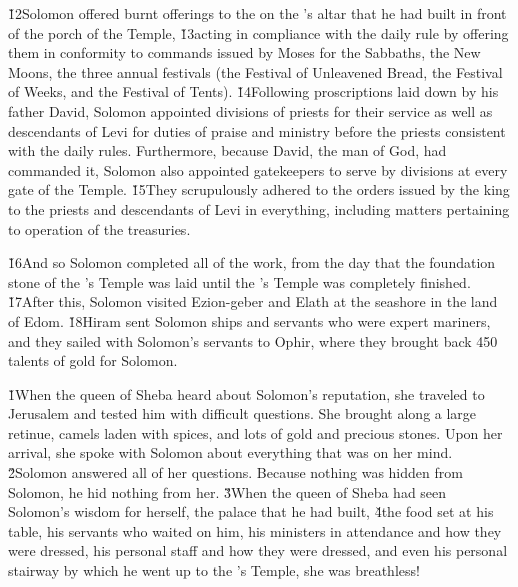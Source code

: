 \v{12}Solomon offered burnt offerings to the  on the 's altar that he had built in front of the porch of the Temple, \v{13}acting in compliance with the daily rule by offering them in conformity to commands issued by Moses for the Sabbaths, the New Moons, the three annual festivals (the Festival of Unleavened Bread, the Festival of Weeks, and the Festival of Tents). \v{14}Following proscriptions laid down by his father David, Solomon appointed divisions of priests for their service as well as descendants of Levi for duties of praise and ministry before the priests consistent with the daily rules. Furthermore, because David, the man of God, had commanded it, Solomon also appointed gatekeepers to serve by divisions at every gate of the Temple. \v{15}They scrupulously adhered to the orders issued by the king to the priests and descendants of Levi in everything, including matters pertaining to operation of the treasuries.

\v{16}And so Solomon completed all of the work, from the day that the foundation stone of the 's Temple was laid until the 's Temple was completely finished. \v{17}After this, Solomon visited Ezion-geber and Elath at the seashore in the land of Edom. \v{18}Hiram sent Solomon ships and servants who were expert mariners, and they sailed with Solomon's servants to Ophir, where they brought back 450 talents of gold for Solomon.

\v{1}When the queen of Sheba heard about Solomon's reputation, she traveled to Jerusalem and tested him with difficult questions. She brought along a large retinue, camels laden with spices, and lots of gold and precious stones. Upon her arrival, she spoke with Solomon about everything that was on her mind. \v{2}Solomon answered all of her questions. Because nothing was hidden from Solomon, he hid nothing from her. \v{3}When the queen of Sheba had seen Solomon's wisdom for herself, the palace that he had built, \v{4}the food set at his table, his servants who waited on him, his ministers in attendance and how they were dressed, his personal staff and how they were dressed, and even his personal stairway by which he went up to the 's Temple, she was breathless!

